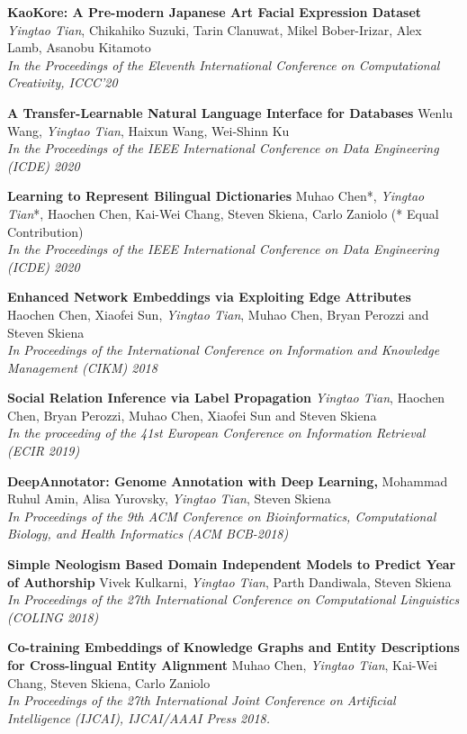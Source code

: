 \documentclass[line,margin]{cv}
\begin{document}
\begin{resume}
	{\bf  KaoKore: A Pre-modern Japanese Art Facial Expression Dataset}
	\emph{Yingtao Tian}, Chikahiko Suzuki, Tarin Clanuwat, Mikel Bober-Irizar, Alex Lamb, Asanobu Kitamoto\\
	\emph{In the Proceedings of the Eleventh International Conference on Computational Creativity, ICCC'20}

	{\bf  A Transfer-Learnable Natural Language Interface for Databases}
	Wenlu Wang, \emph{Yingtao Tian}, Haixun Wang, Wei-Shinn Ku\\
	\emph{In the Proceedings of the IEEE International Conference on Data Engineering (ICDE) 2020}
	
	{\bf  Learning to Represent Bilingual Dictionaries}
	Muhao Chen*, \emph{Yingtao Tian}*, Haochen Chen, Kai-Wei Chang, Steven Skiena, Carlo Zaniolo  (* Equal Contribution)\\
	\emph{In the Proceedings of the IEEE International Conference on Data Engineering (ICDE) 2020}
	
	{\bf  Enhanced Network Embeddings via Exploiting Edge Attributes}
	 Haochen Chen, Xiaofei Sun, \emph{Yingtao Tian}, Muhao Chen, Bryan Perozzi and Steven Skiena\\
	\emph{In Proceedings of the International Conference on Information and Knowledge Management (CIKM) 2018}

	{\bf Social Relation Inference via Label Propagation}
	\emph{Yingtao Tian}, Haochen Chen, Bryan Perozzi, Muhao Chen, Xiaofei Sun and Steven Skiena\\
	\emph{In the proceeding of the 41st European Conference on Information Retrieval (ECIR 2019)}
	
	{\bf DeepAnnotator: Genome Annotation with Deep Learning,}
	Mohammad Ruhul Amin, Alisa Yurovsky, \emph{Yingtao Tian}, Steven Skiena \\
	\emph{In Proceedings of the 9th ACM Conference on Bioinformatics, Computational Biology, and Health Informatics (ACM BCB-2018)}
	
	{\bf Simple Neologism Based Domain Independent Models to Predict Year of Authorship}
	 Vivek Kulkarni, \emph{Yingtao Tian}, Parth Dandiwala, Steven Skiena \\
	\emph{In Proceedings of the 27th International Conference on Computational Linguistics (COLING 2018)}

	{\bf Co-training Embeddings of Knowledge Graphs and Entity Descriptions for Cross-lingual Entity Alignment}
	Muhao Chen, \emph{Yingtao Tian}, Kai-Wei Chang, Steven Skiena, Carlo Zaniolo\\
	\emph{In Proceedings of the 27th International Joint Conference on Artificial Intelligence (IJCAI), IJCAI/AAAI Press 2018.}
	

\end{resume}
\end{document}
